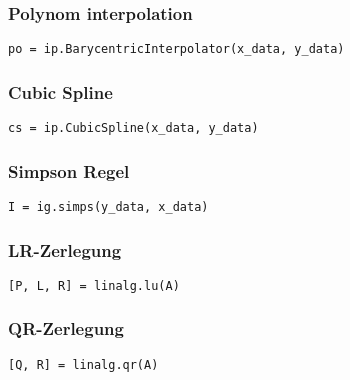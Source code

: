 \subsubsection{Polynom interpolation}

\begin{verbatim}
po = ip.BarycentricInterpolator(x_data, y_data)
\end{verbatim}

\subsubsection{Cubic Spline}

\begin{verbatim}
cs = ip.CubicSpline(x_data, y_data)
\end{verbatim}

\subsubsection{Simpson Regel}

\begin{verbatim}
I = ig.simps(y_data, x_data)
\end{verbatim}

\subsubsection{LR-Zerlegung}

\begin{verbatim}
[P, L, R] = linalg.lu(A)
\end{verbatim}

\subsubsection{QR-Zerlegung}

\begin{verbatim}
[Q, R] = linalg.qr(A)
\end{verbatim}